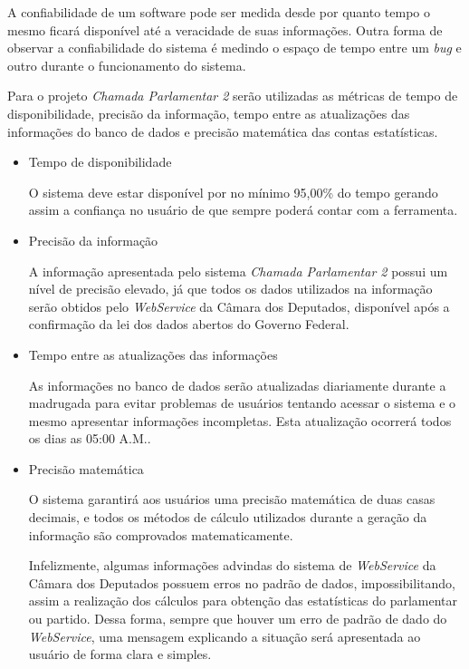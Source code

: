 
A confiabilidade de um software pode ser medida desde por quanto tempo o mesmo ficará disponível até a veracidade de suas informações. Outra forma de observar a confiabilidade do sistema é medindo o espaço de tempo entre um \textit{bug} e outro durante o funcionamento do sistema.

Para o projeto \textit{Chamada Parlamentar 2} serão utilizadas as métricas de tempo de disponibilidade, precisão da informação, tempo entre as atualizações das informações do banco de dados e precisão matemática das contas estatísticas.

\begin{itemize} 

	\item{Tempo de disponibilidade}

		O sistema deve estar disponível por no mínimo 95,00\% do tempo gerando assim a confiança no usuário de que sempre poderá contar com a ferramenta.

	\item{Precisão da informação}

		A informação apresentada pelo sistema \textit{Chamada Parlamentar 2} possui um nível de precisão elevado, já que todos os dados utilizados na informação serão obtidos pelo \textit{WebService} da Câmara dos Deputados, disponível após a confirmação da lei dos dados abertos do Governo Federal.

	\item{Tempo entre as atualizações das informações}

		As informações no banco de dados serão atualizadas diariamente durante a madrugada para evitar problemas de usuários tentando acessar o sistema e o mesmo apresentar informações incompletas. Esta atualização ocorrerá todos os dias as 05:00 A.M..

	\item{Precisão matemática}

		O sistema garantirá aos usuários uma precisão matemática de duas casas decimais, e todos os métodos de cálculo utilizados durante a geração da informação são comprovados matematicamente.

		Infelizmente, algumas informações advindas do sistema de \textit{WebService} da Câmara dos Deputados possuem erros no padrão de dados, impossibilitando, assim a realização dos cálculos para obtenção das estatísticas do parlamentar ou partido. Dessa forma, sempre que houver um erro de padrão de dado do \textit{WebService}, uma mensagem explicando a situação será apresentada ao usuário de forma clara e simples.

\end{itemize}